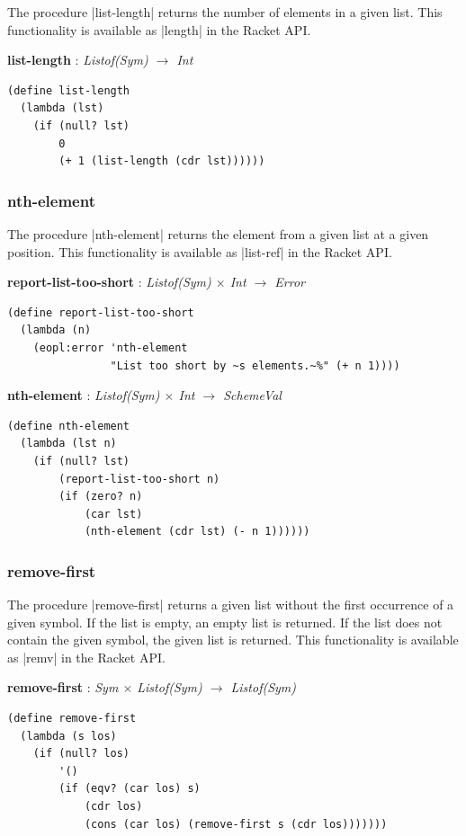 \documentclass[a4paper]{article}
\begin{document}
The procedure |list-length| returns the number of elements in a given list. This functionality is available as |length| in the Racket API.

\textbf{list-length} : \textit{Listof(Sym) $\rightarrow$ Int}
\begin{lstlisting}[aboveskip=0pt]
(define list-length
  (lambda (lst)
    (if (null? lst)
        0
        (+ 1 (list-length (cdr lst))))))
\end{lstlisting}

\subsubsection{nth-element}

The procedure |nth-element| returns the element from a given list at a given position. This functionality is available as |list-ref| in the Racket API.

\textbf{report-list-too-short} : \textit{Listof(Sym) $\times$ Int $\rightarrow$ Error}
\begin{lstlisting}[aboveskip=0pt]
(define report-list-too-short
  (lambda (n)
    (eopl:error 'nth-element
                "List too short by ~s elements.~%" (+ n 1))))
\end{lstlisting}

\textbf{nth-element} : \textit{Listof(Sym) $\times$ Int $\rightarrow$ SchemeVal}
\begin{lstlisting}[aboveskip=0pt]
(define nth-element
  (lambda (lst n)
    (if (null? lst)
        (report-list-too-short n)
        (if (zero? n)
            (car lst)
            (nth-element (cdr lst) (- n 1))))))
\end{lstlisting}

\subsubsection{remove-first}

The procedure |remove-first| returns a given list without the first occurrence of a given symbol. If the list is empty, an empty list is returned. If the list does not contain the given symbol, the given list is returned. This functionality is available as |remv| in the Racket API.

\textbf{remove-first} : \textit{Sym $\times$ Listof(Sym) $\rightarrow$ Listof(Sym)}
\begin{lstlisting}[aboveskip=0pt]
(define remove-first
  (lambda (s los)
    (if (null? los)
        '()
        (if (eqv? (car los) s)
            (cdr los)
            (cons (car los) (remove-first s (cdr los)))))))
\end{lstlisting}
\end{document}
